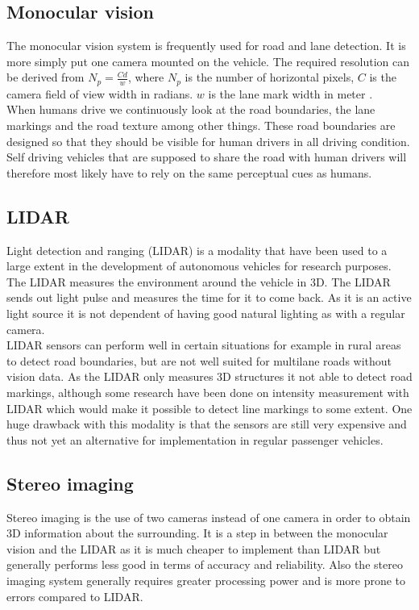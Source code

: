 \subsection{Monocular vision}
The monocular vision system is frequently used for road and lane detection. It is more simply put one camera mounted on the vehicle. The required resolution can be derived from $N_p = \frac{Cd}{w}$, where $N_p$ is the number of horizontal pixels, $C$ is the camera field of view width in radians. $w$ is the lane mark width in meter \cite{BarHillel2014}.\\
When humans drive we continuously look at the road boundaries, the lane markings and the road texture among other things. These road boundaries are designed so that they should be visible for human drivers in all driving condition. Self driving vehicles that are supposed to share the road with human drivers will therefore most likely have to rely on the same perceptual cues as humans.

\subsection{LIDAR}
Light detection and ranging (LIDAR) is a modality that have been used to a large extent in the development of autonomous vehicles for research purposes. The LIDAR measures the environment around the vehicle in 3D. The LIDAR sends out light pulse and measures the time for it to come back. As it is an active light source it is not dependent of having good natural lighting as with a regular camera. \\

LIDAR sensors can perform well in certain situations for example in rural areas to detect road boundaries, \cite{BarHillel2014} but are not well suited for multilane roads without vision data. As the LIDAR only measures 3D structures it not able to detect road markings, although some research have been done on intensity measurement with LIDAR \cite{huang2009finding} \cite{kammel2008lidar} which would make it possible to detect line markings to some extent. One huge drawback with this modality is that the sensors are still very expensive and thus not yet an alternative for implementation in regular passenger vehicles.

\subsection{Stereo imaging}
Stereo imaging is the use of two cameras instead of one camera in order to obtain 3D information about the surrounding. It is a step in between the monocular vision and the LIDAR as it is much cheaper to implement than LIDAR but generally performs less good in terms of accuracy and reliability.  Also the stereo imaging system generally requires greater processing power and is more prone to errors compared to LIDAR. 


